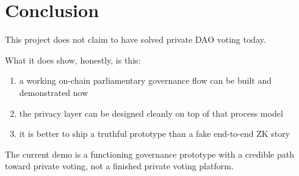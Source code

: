 \documentclass[12pt]{article}
\begin{document}
\section{Conclusion}

This project does not claim to have solved private DAO voting today.

What it does show, honestly, is this:
\begin{enumerate}
    \item a working on-chain parliamentary governance flow can be built and demonstrated now
    \item the privacy layer can be designed cleanly on top of that process model
    \item it is better to ship a truthful prototype than a fake end-to-end ZK story
\end{enumerate}

The current demo is a functioning governance prototype with a credible path toward private voting, not a finished private voting platform.
\end{document}
